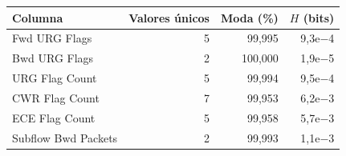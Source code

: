 \begin{tabular}{@{}lrrr@{}}
\toprule
Columna & Valores únicos & Moda (\%) & $H$ (bits) \\
\midrule
Fwd URG Flags & 5 & 99{,}995 & 9{,}3e$-$4 \\
Bwd URG Flags & 2 & 100{,}000 & 1{,}9e$-$5 \\
URG Flag Count & 5 & 99{,}994 & 9{,}5e$-$4 \\
CWR Flag Count & 7 & 99{,}953 & 6{,}2e$-$3 \\
ECE Flag Count & 5 & 99{,}958 & 5{,}7e$-$3 \\
Subflow Bwd Packets & 2 & 99{,}993 & 1{,}1e$-$3 \\
\bottomrule
\end{tabular}
